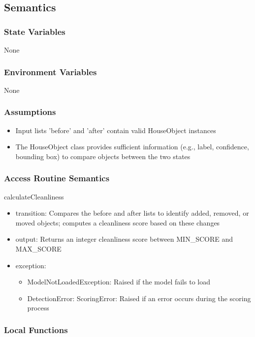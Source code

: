 \documentclass[12pt, titlepage]{article}
\begin{document}
\subsection{Semantics}

\subsubsection{State Variables}
None


\subsubsection{Environment Variables}
None

\subsubsection{Assumptions}
\begin{itemize}
  \item Input lists 'before' and 'after' contain valid HouseObject instances
  \item The HouseObject class provides sufficient information (e.g., label, confidence, bounding box) to compare objects between the two states
\end{itemize}


\subsubsection{Access Routine Semantics}

\noindent calculateCleanliness
\begin{itemize}
\item transition: Compares the before and after lists to identify added, removed, or moved objects; computes a cleanliness score based on these changes
\item output: Returns an integer cleanliness score between MIN{\_}SCORE and MAX{\_}SCORE
\item exception: 
\begin{itemize}
  \item ModelNotLoadedException: Raised if the model fails to load
  \item DetectionError: ScoringError: Raised if an error occurs during the scoring process
\end{itemize}

\end{itemize}


\subsubsection{Local Functions}
\end{document}
